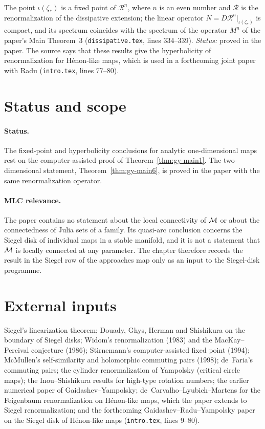 \begin{theorem}
\label{thm:gy-main6}
The point $\iota(\zeta_*)$ is a fixed point of $\mathcal R^n$, where $n$ is an even number and $\mathcal R$ is the renormalization of
the dissipative extension; the linear operator $N=D\mathcal R^n|_{\iota(\zeta_*)}$ is compact, and its spectrum coincides with the
spectrum of the operator $M^n$ of the paper's Main Theorem~3 (\texttt{dissipative.tex}, lines 334--339).  \emph{Status:} proved in the
paper.  The source says that these results give the hyperbolicity of renormalization for H\'enon-like maps, which is used in a
forthcoming joint paper with Radu (\texttt{intro.tex}, lines 77--80).
\end{theorem}

\section{Status and scope}
\label{sec:siegel-scope}

\paragraph{Status.}
The fixed-point and hyperbolicity conclusions for analytic one-dimensional maps rest on the computer-assisted proof of
Theorem~\ref{thm:gy-main1}.  The two-dimensional statement, Theorem~\ref{thm:gy-main6}, is proved in the paper with the same
renormalization operator.

\paragraph{MLC relevance.}
The paper contains no statement about the local connectivity of $\mathcal M$ or about the connectedness of Julia sets of a family.  Its
quasi-arc conclusion concerns the Siegel disk of individual maps in a stable manifold, and it is not a statement that $\mathcal M$ is
locally connected at any parameter.  The chapter therefore records the result in the Siegel row of the approaches map only as an
input to the Siegel-disk programme.

\section{External inputs}
\label{sec:siegel-inputs}

Siegel's linearization theorem; Douady, Ghys, Herman and Shishikura on the boundary of Siegel disks; Widom's renormalization
(1983) and the MacKay--Percival conjecture (1986); Stirnemann's computer-assisted fixed point (1994); McMullen's
self-similarity and holomorphic commuting pairs (1998); de~Faria's commuting pairs; the cylinder renormalization of Yampolsky
(critical circle maps); the Inou--Shishikura results for high-type rotation numbers; the earlier numerical paper of
Gaidashev--Yampolsky; de~Carvalho--Lyubich--Martens for the Feigenbaum renormalization on H\'enon-like maps, which the paper
extends to Siegel renormalization; and the forthcoming Gaidashev--Radu--Yampolsky paper on the Siegel disk of H\'enon-like maps
(\texttt{intro.tex}, lines 9--80).
